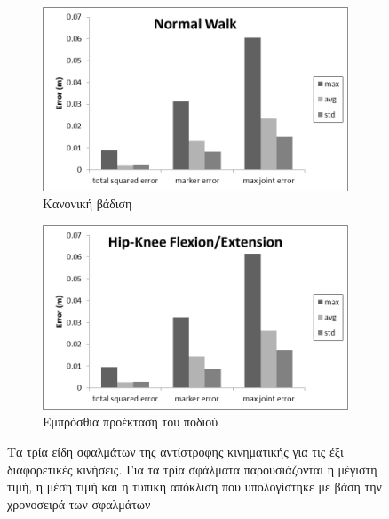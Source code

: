 \begin{figure}[H]
    \begin{subfigure}[t]{.48\textwidth}
        \includegraphics[width=\textwidth, keepaspectratio]{fig/ik-reg5.png}
        \caption{Κανονική βάδιση}
        \label{fig:noraml-walk}
    \end{subfigure}
    \begin{subfigure}[t]{.48\textwidth}
        \includegraphics[width=\textwidth, keepaspectratio]{fig/ik-reg6.png}
        \caption{Εμπρόσθια προέκταση του ποδιού}
        \label{fig:knee-hip-extension}
    \end{subfigure}
    \caption{Τα τρία είδη σφαλμάτων της αντίστροφης κινηματικής για τις έξι διαφορετικές κινήσεις. Για τα τρία σφάλματα παρουσιάζονται η μέγιστη τιμή, η μέση τιμή και η τυπική απόκλιση που υπολογίστηκε με βάση την χρονοσειρά των σφαλμάτων}
    \label{fig:ik-error-regions}
\end{figure}

